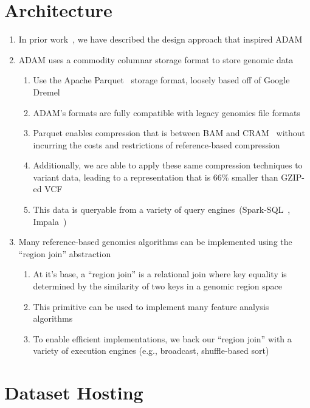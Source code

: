 \documentclass{nature}
\begin{document}
\begin{methods}
\begin{refsegment}

\section{Architecture}
\label{sec:supplement-architecture}

\begin{enumerate}
\item In prior work~\cite{nothaft15}, we have described the design approach that
inspired ADAM~\cite{zaharia10}
\item ADAM uses a commodity columnar storage format to store genomic data
\begin{enumerate}
\item Use the Apache Parquet~\cite{parquet} storage format, loosely based off of
Google Dremel~\cite{melnik10}
\item ADAM's formats are fully compatible with legacy genomics file formats
\item Parquet enables compression that is between BAM and CRAM~\cite{fritz11} without
incurring the costs and restrictions of reference-based compression
\item Additionally, we are able to apply these same compression techniques to
variant data, leading to a representation that is 66\% smaller than GZIP-ed VCF
\item This data is queryable from a variety of query engines~(Spark-SQL~\cite{armbrust15},
Impala~\cite{kornacker15})
\end{enumerate}
\item Many reference-based genomics algorithms can be implemented using the ``region join''
abstraction
\begin{enumerate}
\item At it's base, a ``region join'' is a relational join where key equality is determined
by the similarity of two keys in a genomic region space
\item This primitive can be used to implement many feature analysis algorithms~\cite{quinlan10}
\item To enable efficient implementations, we back our ``region join'' with a variety of
execution engines (e.g., broadcast, shuffle-based sort)
\end{enumerate}
\end{enumerate}

\section{Dataset Hosting}
\label{sec:dataset-hosting}


\end{refsegment}
\end{methods}
\end{document}
